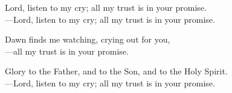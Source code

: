 \responsory

\noindent Lord, listen to my cry; all my trust is in your promise.\\
{\color{red}---\thinspace}Lord, listen to my cry; all my trust is in your promise.

\medskip\noindent Dawn finds me watching, crying out for you,\\
{\color{red}---\thinspace}all my trust is in your promise.

\medskip\noindent Glory to the Father, and to the Son, and to the Holy Spirit.\\
{\color{red}---\thinspace}Lord, listen to my cry; all my trust is in your promise.